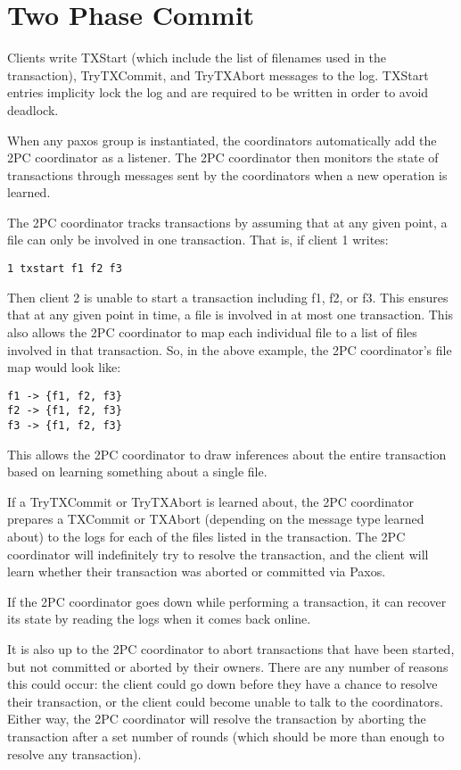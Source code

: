 \documentclass[11pt]{article}
\begin{document}
\section{Two Phase Commit}

Clients write TXStart (which include the list of filenames used in the transaction), TryTXCommit, and TryTXAbort messages to the log.
TXStart entries implicity lock the log and are required to be written in order to avoid deadlock.

When any paxos group is instantiated, the coordinators automatically add the 2PC coordinator as a listener. The 2PC coordinator then monitors the state of transactions through messages sent by the coordinators when a new operation is learned.

The 2PC coordinator tracks transactions by assuming that at any given point, a file can only be involved in one transaction. That is, if client 1 writes:
\begin{verbatim}
1 txstart f1 f2 f3
\end{verbatim}

Then client 2 is unable to start a transaction including f1, f2, or f3. This ensures that at any given point in time, a file is involved in at most one transaction. This also allows the 2PC coordinator to map each individual file to a list of files involved in that transaction. So, in the above example, the 2PC coordinator's file map would look like:

\begin{verbatim}
f1 -> {f1, f2, f3}
f2 -> {f1, f2, f3}
f3 -> {f1, f2, f3}
\end{verbatim}
This allows the 2PC coordinator to draw inferences about the entire transaction based on learning something about a single file.

If a TryTXCommit or TryTXAbort is learned about, the 2PC coordinator prepares a TXCommit or TXAbort (depending on the message type learned about) to the logs for each of the files listed in the transaction. The 2PC coordinator will indefinitely try to resolve the transaction, and the client will learn whether their transaction was aborted or committed via Paxos. 

If the 2PC coordinator goes down while performing a transaction, it can recover its state by reading the logs when it comes back online.

It is also up to the 2PC coordinator to abort transactions that have been started, but not committed or aborted by their owners. There are any number of reasons this could occur: the client could go down before they have a chance to resolve their transaction, or the client could become unable to talk to the coordinators. Either way, the 2PC coordinator will resolve the transaction by aborting the transaction after a set number of rounds (which should be more than enough to resolve any transaction).
\end{document}
